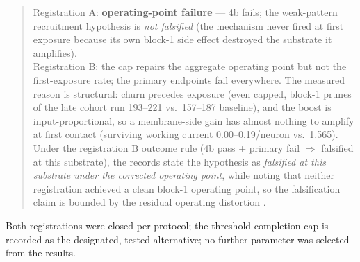 \begin{quote}
Registration A: \textbf{operating-point failure} --- 4b fails; the
weak-pattern recruitment hypothesis is \emph{not falsified} (the
mechanism never fired at first exposure because its own block-1 side
effect destroyed the substrate it amplifies).\\[2pt]
Registration B: the cap repairs the aggregate operating point but not
the first-exposure rate; the primary endpoints fail everywhere. The
measured reason is structural: churn precedes exposure (even capped,
block-1 prunes of the late cohort run 193--221 vs.\ 157--187
baseline), and the boost is input-proportional, so a membrane-side gain
has almost nothing to amplify at first contact (surviving working
current 0.00--0.19/neuron vs.\ 1.565). Under the registration B
outcome rule (4b pass + primary fail \(\Rightarrow\) falsified at this
substrate), the records state the hypothesis as \emph{falsified at this
substrate under the corrected operating point}, while noting that
neither registration achieved a clean block-1 operating point, so the
falsification claim is bounded by the residual operating distortion
\cite{rg8c}.
\end{quote}

Both registrations were closed per protocol; the threshold-completion
cap is recorded as the designated, tested alternative; no further
parameter was selected from the results.